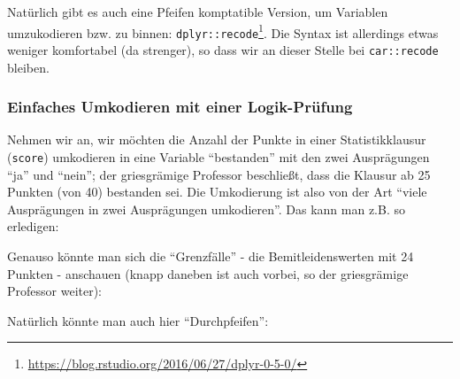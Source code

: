 \documentclass[12pt,ngerman,]{book}
\makeatletter
\newenvironment{Shaded}{\begin{snugshade}}{\end{snugshade}}
\newcommand{\KeywordTok}[1]{\textcolor[rgb]{0.13,0.29,0.53}{\textbf{{#1}}}}
\newcommand{\DataTypeTok}[1]{\textcolor[rgb]{0.13,0.29,0.53}{{#1}}}
\newcommand{\DecValTok}[1]{\textcolor[rgb]{0.00,0.00,0.81}{{#1}}}
\newcommand{\StringTok}[1]{\textcolor[rgb]{0.31,0.60,0.02}{{#1}}}
\newcommand{\CommentTok}[1]{\textcolor[rgb]{0.56,0.35,0.01}{\textit{{#1}}}}
\newcommand{\NormalTok}[1]{{#1}}
\let\rmarkdownfootnote\footnote%
\def\footnote{\protect\rmarkdownfootnote}
\newenvironment{kframe}{%
\medskip{}
\setlength{\fboxsep}{.8em}
 \def\at@end@of@kframe{}%
 \ifinner\ifhmode%
  \def\at@end@of@kframe{\end{minipage}}%
  \begin{minipage}{\columnwidth}%
 \fi\fi%
 \def\FrameCommand##1{\hskip\@totalleftmargin \hskip-\fboxsep
 \colorbox{shadecolor}{##1}\hskip-\fboxsep
     \hskip-\linewidth \hskip-\@totalleftmargin \hskip\columnwidth}%
 \MakeFramed {\advance\hsize-\width
   \@totalleftmargin\z@ \linewidth\hsize
   \@setminipage}}%
 {\par\unskip\endMakeFramed%
 \at@end@of@kframe}
\renewenvironment{Shaded}{\begin{kframe}}{\end{kframe}}
\makeatother
\begin{document}
Natürlich gibt es auch eine Pfeifen komptatible Version, um Variablen
umzukodieren bzw. zu binnen: \texttt{dplyr::recode}\footnote{\url{https://blog.rstudio.org/2016/06/27/dplyr-0-5-0/}}.
Die Syntax ist allerdings etwas weniger komfortabel (da strenger), so
dass wir an dieser Stelle bei \texttt{car::recode} bleiben.

\subsubsection{Einfaches Umkodieren mit einer
Logik-Prüfung}\label{einfaches-umkodieren-mit-einer-logik-prufung}

Nehmen wir an, wir möchten die Anzahl der Punkte in einer
Statistikklausur (\texttt{score}) umkodieren in eine Variable
``bestanden'' mit den zwei Ausprägungen ``ja'' und ``nein''; der
griesgrämige Professor beschließt, dass die Klausur ab 25 Punkten (von
40) bestanden sei. Die Umkodierung ist also von der Art ``viele
Ausprägungen in zwei Ausprägungen umkodieren''. Das kann man z.B. so
erledigen:

\begin{Shaded}
\end{Shaded}

Genauso könnte man sich die ``Grenzfälle'' - die Bemitleidenswerten mit
24 Punkten - anschauen (knapp daneben ist auch vorbei, so der
griesgrämige Professor weiter):

\begin{Shaded}
\end{Shaded}

Natürlich könnte man auch hier ``Durchpfeifen'':

\begin{Shaded}
\end{Shaded}
\end{document}
